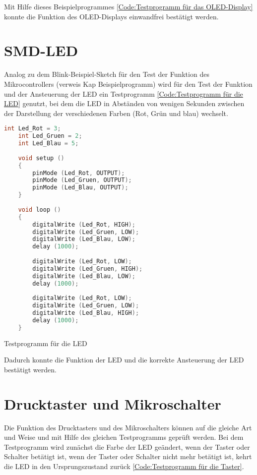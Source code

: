 Mit Hilfe dieses Beispielprogrammes \ref{Code:Testprogramm für das OLED-Display} konnte die Funktion des OLED-Displays einwandfrei bestätigt werden.

\section{SMD-LED}

Analog zu dem Blink-Beispiel-Sketch für den Test der Funktion des Mikrocontrollers (verweis Kap Beispielprogramm) wird für den Test der Funktion und der Ansteuerung der LED ein Testprogramm \ref{Code:Testprogramm für die LED} genutzt, bei dem die LED in Abständen von wenigen Sekunden zwischen der Darstellung der verschiedenen Farben (Rot, Grün und blau) wechselt.

\begin{code}
	\begin{lstlisting}[language=c++]
	int Led_Rot = 3;
	int Led_Gruen = 2;
	int Led_Blau = 5;
	
	void setup ()
	{
		pinMode (Led_Rot, OUTPUT); 
		pinMode (Led_Gruen, OUTPUT);
		pinMode (Led_Blau, OUTPUT); 
	}
	
	void loop ()
	{
		digitalWrite (Led_Rot, HIGH);
		digitalWrite (Led_Gruen, LOW);
		digitalWrite (Led_Blau, LOW);
		delay (1000);
		
		digitalWrite (Led_Rot, LOW);
		digitalWrite (Led_Gruen, HIGH);
		digitalWrite (Led_Blau, LOW);
		delay (1000);
		
		digitalWrite (Led_Rot, LOW);
		digitalWrite (Led_Gruen, LOW);
		digitalWrite (Led_Blau, HIGH);
		delay (1000);
	}
\end{lstlisting}      

\caption[Testprogramm für die LED]{Testprogramm für die LED}\label{Code:Testprogramm für die LED}    
\end{code} 

Dadurch konnte die Funktion der LED und die korrekte Ansteuerung der LED bestätigt werden.

\section{Drucktaster und Mikroschalter}

Die Funktion des Drucktasters und des Mikroschalters können auf die gleiche Art und Weise und mit Hilfe des gleichen Testprogramms geprüft werden. Bei dem Testprogramm wird zunächst die Farbe der LED geändert, wenn der Taster oder Schalter betätigt ist, wenn der Taster oder Schalter nicht mehr betätigt ist, kehrt die LED in den Ursprungszustand zurück \ref{Code:Testprogramm für die Taster}.

